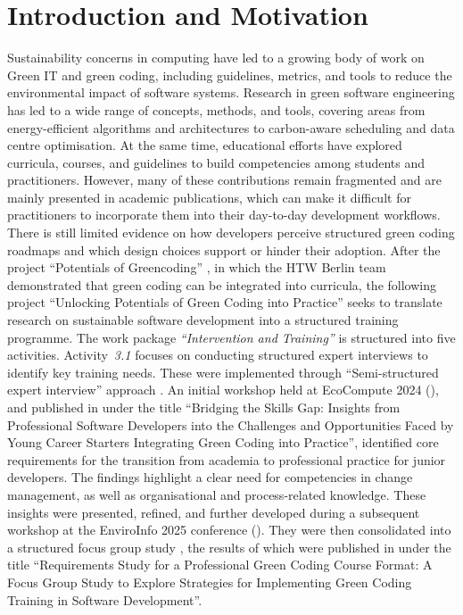 \documentclass[english]{lni}
\begin{document}
\newpage
\section{Introduction and Motivation}

Sustainability concerns in computing have led to a growing body of work on Green IT and green coding, including guidelines, metrics, and tools to reduce the environmental impact of software systems. Research in green software engineering has led to a wide range of concepts, methods, and tools, covering areas from energy-efficient algorithms and architectures to carbon-aware scheduling and data centre optimisation. At the same time, educational efforts have explored curricula, courses, and guidelines to build competencies among students and practitioners. However, many of these contributions remain fragmented and are mainly presented in academic publications, which can make it difficult for practitioners to incorporate them into their day-to-day development workflows. There is still limited evidence on how developers perceive structured green coding roadmaps and which design choices support or hinder their adoption. After the project \enquote{Potentials of Greencoding} \cite{potentialsproject}, in which the HTW Berlin team demonstrated that green coding can be integrated into curricula, the following project \enquote{Unlocking Potentials of Green Coding into Practice} \cite{UnlockingGreenCoding2024} seeks to translate research on sustainable software development into a structured training programme.
The work package \emph{\enquote{Intervention and Training}} is structured into five activities. Activity~\emph{3.1} focuses on conducting structured expert interviews to identify key training needs. These were implemented through \enquote{Semi-structured expert interview} approach \cite{louklander2025justasking}.
An initial workshop held at EcoCompute 2024 (\cite{ecocompute24}), and published in \cite{junger24-2} under the title \enquote{Bridging the Skills Gap: Insights from Professional Software Developers into the Challenges and Opportunities Faced by Young Career Starters Integrating Green Coding into Practice}, identified core requirements for the transition from academia to professional practice for junior developers. The findings highlight a clear need for competencies in change management, as well as organisational and process-related knowledge.
These insights were presented, refined, and further developed during a subsequent workshop at the EnviroInfo 2025 conference (\cite{enviroInfo25}). They were then consolidated into a structured focus group study \cite{Kitzinger299}, the results of which were published in \cite{JungerWohlgemuth2025} under the title \enquote{Requirements Study for a Professional Green Coding Course Format: A Focus Group Study to Explore Strategies for Implementing Green Coding Training in Software Development}. 
\end{document}
